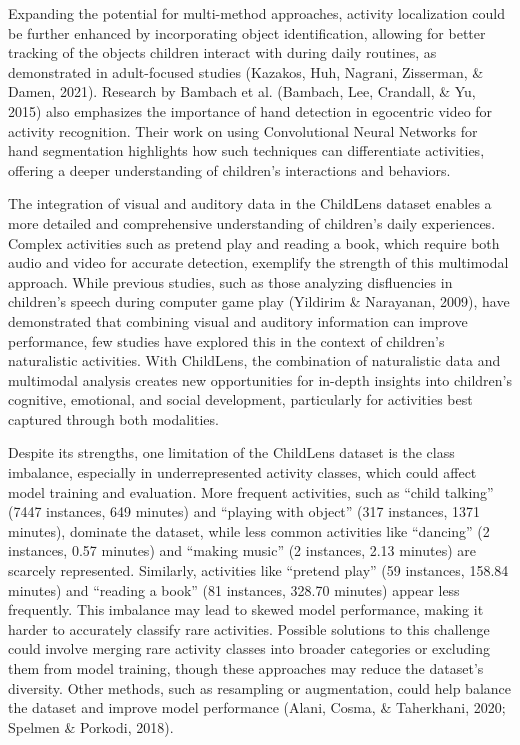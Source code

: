 \documentclass[
  man,floatsintext]{apa6}
\begin{document}
Expanding the potential for multi-method approaches, activity localization could be further enhanced by incorporating object identification, allowing for better tracking of the objects children interact with during daily routines, as demonstrated in adult-focused studies (Kazakos, Huh, Nagrani, Zisserman, \& Damen, 2021). Research by Bambach et al. (Bambach, Lee, Crandall, \& Yu, 2015) also emphasizes the importance of hand detection in egocentric video for activity recognition. Their work on using Convolutional Neural Networks for hand segmentation highlights how such techniques can differentiate activities, offering a deeper understanding of children's interactions and behaviors.

The integration of visual and auditory data in the ChildLens dataset enables a more detailed and comprehensive understanding of children's daily experiences. Complex activities such as pretend play and reading a book, which require both audio and video for accurate detection, exemplify the strength of this multimodal approach. While previous studies, such as those analyzing disfluencies in children's speech during computer game play (Yildirim \& Narayanan, 2009), have demonstrated that combining visual and auditory information can improve performance, few studies have explored this in the context of children's naturalistic activities. With ChildLens, the combination of naturalistic data and multimodal analysis creates new opportunities for in-depth insights into children's cognitive, emotional, and social development, particularly for activities best captured through both modalities.

Despite its strengths, one limitation of the ChildLens dataset is the class imbalance, especially in underrepresented activity classes, which could affect model training and evaluation. More frequent activities, such as ``child talking'' (7447 instances, 649 minutes) and ``playing with object'' (317 instances, 1371 minutes), dominate the dataset, while less common activities like ``dancing'' (2 instances, 0.57 minutes) and ``making music'' (2 instances, 2.13 minutes) are scarcely represented. Similarly, activities like ``pretend play'' (59 instances, 158.84 minutes) and ``reading a book'' (81 instances, 328.70 minutes) appear less frequently. This imbalance may lead to skewed model performance, making it harder to accurately classify rare activities. Possible solutions to this challenge could involve merging rare activity classes into broader categories or excluding them from model training, though these approaches may reduce the dataset's diversity. Other methods, such as resampling or augmentation, could help balance the dataset and improve model performance (Alani, Cosma, \& Taherkhani, 2020; Spelmen \& Porkodi, 2018).
\end{document}
